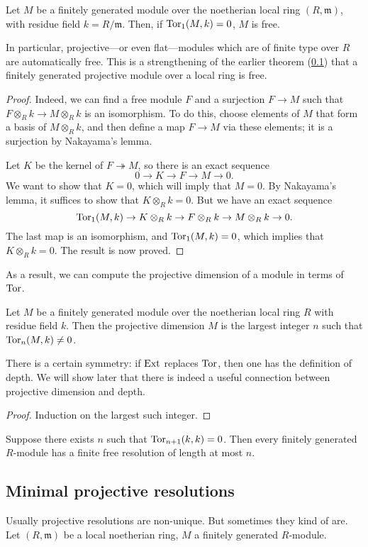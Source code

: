 \begin{theorem} 
Let $M$ be a finitely generated module over the noetherian local ring $(R,
\mathfrak{m})$, with residue field $k = R/\mathfrak{m}$. Then, if $\operatorname{Tor}_1(M, k)
= 0$, $M$ is free.
\end{theorem} 
In particular, projective---or even flat---modules which are of finite type
over $R$ are automatically free.
This is a strengthening of the earlier theorem (\cref{}) that a finitely
generated projective
module over a local ring is free.
\begin{proof} 
Indeed, we can find a free module $F$ and a surjection $F \to M$ such that $F
\otimes_R k \to M \otimes_R k$ is an isomorphism. To do this, choose elements
of $M$ that form a basis of $M \otimes_R k$, and then define a map $F \to M$
via these elements; it is a surjection by Nakayama's lemma.

Let $K$ be the kernel of $F \twoheadrightarrow M$, so there is an exact sequence 
\[ 0 \to K \to F \to M \to 0.  \]
We want to show that $K = 0$, which will imply that $M = 0$. By Nakayama's
lemma, it suffices to show that $K \otimes_R k = 0$. But we have an exact
sequence
\[ \operatorname{Tor}_1(M, k) \to K \otimes_R k \to F \otimes_R k \to M \otimes_R k \to 0.  \]
The last map is an isomorphism, and $\operatorname{Tor}_1(M, k) = 0$, which implies that $K
\otimes_R k = 0$. The result is now proved.
\end{proof} 

As a result, we can compute the projective dimension of a module in terms of
$\operatorname{Tor}$.
\begin{corollary} 
Let $M$ be a finitely generated module over the noetherian local ring $R$ with
residue field $k$. Then the projective dimension $M$ is the largest integer $n$
such that 
$\operatorname{Tor}_n(M, k) \neq 0$.
\end{corollary} 
There is a certain symmetry: if $\operatorname{Ext}$ replaces $\operatorname{Tor}$, then one has the
definition of depth. We will show later that there is indeed a useful connection
between projective dimension and depth.
\begin{proof} 
Induction on the largest such integer. 
\end{proof} 


\begin{corollary} 
Suppose there exists $n$ such that $\operatorname{Tor}_{n+1}(k, k) = 0$. 
Then every finitely generated $R$-module has a finite free resolution of length
at most $n$.
\end{corollary} 
\subsection{Minimal projective resolutions}
Usually projective resolutions are non-unique. But sometimes
they kind of are.
Let $(R, \mathfrak{m})$ be a local noetherian ring, $M$ a
finitely generated $R$-module.

